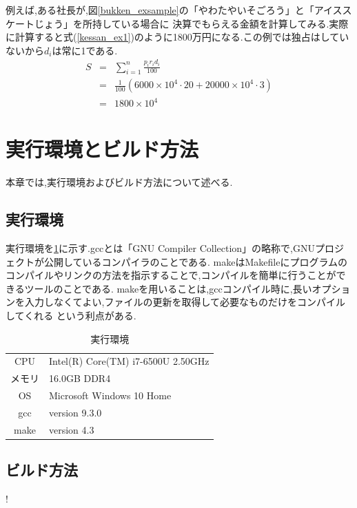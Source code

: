 \documentclass[a4j]{jarticle}
\begin{document}
        例えば,ある社長が,図\ref{bukken_exsample}の「やわたやいそごろう」と「アイススケートじょう」を所持している場合に
      決算でもらえる金額を計算してみる.実際に計算すると式(\ref{kessan_ex1})のように1800万円になる.この例では独占はしていないから$d_i$は常に1である.
      \begin{eqnarray}
        S &=& \sum_{i=1}^{n} \frac{p_i r_i d_i}{100} \\
          &=& \frac{1}{100} \left( 6000\times10^4 \cdot 20 + 20000\times10^4 \cdot 3 \right) \\
          &=& 1800 \times10^4
        \label{kessan_ex1}
      \end{eqnarray}    

    \section{実行環境とビルド方法}
    本章では,実行環境およびビルド方法について述べる.
    \subsection{実行環境}
    実行環境を\ref{env}に示す.gccとは「GNU Compiler Collection」の略称で,GNUプロジェクトが公開しているコンパイラのことである.
    makeはMakefileにプログラムのコンパイルやリンクの方法を指示することで,コンパイルを簡単に行うことができるツールのことである.
    makeを用いることは,gccコンパイル時に,長いオプションを入力しなくてよい,ファイルの更新を取得して必要なものだけをコンパイルしてくれる
    という利点がある.

    \begin{table}[H]
      \caption{実行環境}
    \label{env}
    \begin{center}
        \begin{tabular}{c|l}\hline
          CPU & Intel(R) Core(TM) i7-6500U 2.50GHz  \\ 
          メモリ & 16.0GB DDR4 \\
          OS & Microsoft Windows 10 Home \\
          gcc &  version 9.3.0 \\
          make & version 4.3 \\ \hline
        \end{tabular}
    \end{center}
    \end{table}

    \subsection{ビルド方法}
    !
\end{document}
